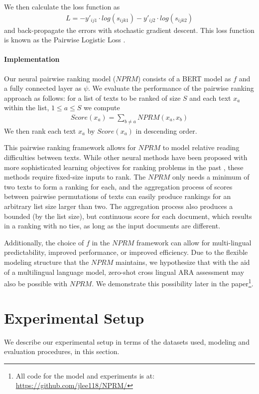 \documentclass[11pt]{article}
\begin{document}
We then calculate the loss function as 
\begin{align*}
    L = - y'_{ij1} \cdot log(s_{ijk1}) - y'_{ij2} \cdot log(s_{ijk2})
\end{align*}
and back-propagate the errors with stochastic gradient descent. This loss function is known as the Pairwise Logistic Loss \cite{Han.Wang.ea-20}.

\paragraph{Implementation} 
Our neural pairwise ranking model ($NPRM$) consists of a BERT \cite{devlin2018bert} model as $f$ and a fully connected layer as $\psi$. We evaluate the performance of the pairwise ranking approach as follows: for a list of texts to be ranked of size $S$ and each text $x_a$ within the list, $1 \leq a \leq S$  we compute 
\begin{align*}
   Score(x_a) =  \sum_{b\neq a}^{}NPRM(x_a, x_b)
\end{align*}
We then rank each text $x_a$ by $Score(x_a)$ in descending order.

This pairwise ranking framework allows for $NPRM$ to model relative reading difficulties between texts. While other neural methods have been proposed with more sophisticated learning objectives for ranking problems in the past \cite{Wang.Li.ea-18, Ai.Wang.ea-19}, these methods require fixed-size inputs to rank. The $NPRM$ only needs a minimum of two texts to form a ranking for each, and the aggregation process of scores between pairwise permutations of texts can easily produce rankings for an arbitrary list size larger than two. The  aggregation process also produces a bounded (by the list size), but continuous score for each document, which results in a ranking with no ties, as long as the input documents are different. 

Additionally, the choice of $f$ in the $NPRM$ framework can allow for multi-lingual predictability, improved performance, or improved efficiency. Due to the flexible modeling structure that the $NPRM$ maintains, we hypothesize that with the aid of a multilingual language model, zero-shot cross lingual ARA assessment may also be possible with $NPRM$. We demonstrate this possibility later in the paper\footnote{All code for the model and experiments is at: \url{https://github.com/jlee118/NPRM/}}. 

\section{Experimental Setup}
\label{sec:setup}
We describe our experimental setup in terms of the datasets used, modeling and evaluation procedures, in this section. 
\end{document}
